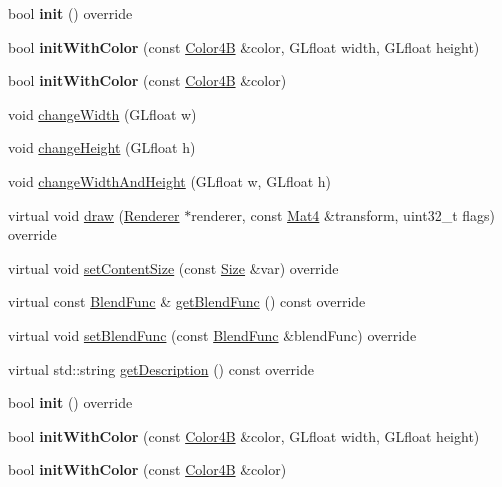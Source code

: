 \begin{DoxyCompactItemize}
bool {\bfseries init} () override
\item 
\mbox{\label{classLayerColor_a2beb7d97ac512f361828d4e3b9796e54}} 
bool {\bfseries init\+With\+Color} (const \hyperlink{structColor4B}{Color4B} \&color, G\+Lfloat width, G\+Lfloat height)
\item 
\mbox{\label{classLayerColor_ab300ff9b4d60b38a477312296178a863}} 
bool {\bfseries init\+With\+Color} (const \hyperlink{structColor4B}{Color4B} \&color)
\item 
void \hyperlink{classLayerColor_af83dd9117f51a87589c5daf0c5993a58}{change\+Width} (G\+Lfloat w)
\item 
void \hyperlink{classLayerColor_a332b62f7f0156415544fa0c53d851692}{change\+Height} (G\+Lfloat h)
\item 
void \hyperlink{classLayerColor_a798a5f19b6961adc375079909943ec84}{change\+Width\+And\+Height} (G\+Lfloat w, G\+Lfloat h)
\item 
virtual void \hyperlink{classLayerColor_a16ab99f5a4d63be4781d70d581ac1cda}{draw} (\hyperlink{classRenderer}{Renderer} $\ast$renderer, const \hyperlink{classMat4}{Mat4} \&transform, uint32\+\_\+t flags) override
\item 
virtual void \hyperlink{classLayerColor_a3db3f4ffab871cc95a3dca8476c22251}{set\+Content\+Size} (const \hyperlink{classSize}{Size} \&var) override
\item 
virtual const \hyperlink{structBlendFunc}{Blend\+Func} \& \hyperlink{classLayerColor_a5329202ee38447c704da09504cc4dcd5}{get\+Blend\+Func} () const override
\item 
virtual void \hyperlink{classLayerColor_a8800e2c47de7beaf137c0e12007910bb}{set\+Blend\+Func} (const \hyperlink{structBlendFunc}{Blend\+Func} \&blend\+Func) override
\item 
virtual std\+::string \hyperlink{classLayerColor_a363da7455314bdf8a5fd4f809e70796e}{get\+Description} () const override
\item 
\mbox{\label{classLayerColor_a21031983a964afaf67dc5239af5c7f97}} 
bool {\bfseries init} () override
\item 
\mbox{\label{classLayerColor_a2beb7d97ac512f361828d4e3b9796e54}} 
bool {\bfseries init\+With\+Color} (const \hyperlink{structColor4B}{Color4B} \&color, G\+Lfloat width, G\+Lfloat height)
\item 
\mbox{\label{classLayerColor_ab300ff9b4d60b38a477312296178a863}} 
bool {\bfseries init\+With\+Color} (const \hyperlink{structColor4B}{Color4B} \&color)
\end{DoxyCompactItemize}
